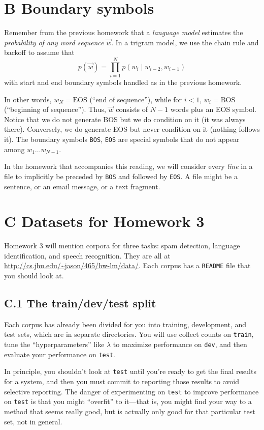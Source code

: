 \documentclass[12pt]{article}
\theoremstyle{plain}
\theoremstyle{definition}
\theoremstyle{remark}
\begin{document}
\section*{B Boundary symbols}
Remember from the previous homework that a \textit{language model} estimates the \textit{probability of any word sequence} $\vec{w}$. In a trigram model, we use the chain rule and backoff to assume that
\[
p(\vec{w}) = \prod_{i=1}^{N} p(w_i \mid w_{i-2}, w_{i-1})
\]
with start and end boundary symbols handled as in the previous homework.

In other words, $w_N = \text{EOS}$ (“end of sequence”), while for $i < 1$, $w_i = \text{BOS}$ (“beginning of sequence”). Thus, $\vec{w}$ consists of $N-1$ words plus an EOS symbol. Notice that we do not generate BOS but we do condition on it (it was always there). Conversely, we do generate EOS but never condition on it (nothing follows it). The boundary symbols \texttt{BOS}, \texttt{EOS} are special symbols that do not appear among $w_1 \ldots w_{N-1}$.

In the homework that accompanies this reading, we will consider every \textit{line} in a file to implicitly be preceded by \texttt{BOS} and followed by \texttt{EOS}. A file might be a sentence, or an email message, or a text fragment.

\section*{C Datasets for Homework 3}
Homework 3 will mention corpora for three tasks: spam detection, language identification, and speech recognition. They are all at \url{http://cs.jhu.edu/~jason/465/hw-lm/data/}. Each corpus has a \texttt{README} file that you should look at.

\subsection*{C.1 The train/dev/test split}
Each corpus has already been divided for you into training, development, and test sets, which are in separate directories. You will use collect counts on \texttt{train}, tune the “hyperparameters” like $\lambda$ to maximize performance on \texttt{dev}, and then evaluate your performance on \texttt{test}.

In principle, you shouldn’t look at \texttt{test} until you’re ready to get the final results for a system, and then you must commit to reporting those results to avoid selective reporting. The danger of experimenting on \texttt{test} to improve performance on \texttt{test} is that you might “overfit” to it—that is, you might find your way to a method that seems really good, but is actually only good for that particular test set, not in general.
\end{document}

